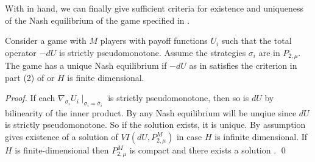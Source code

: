 With  in hand, we can finally give sufficient criteria for existence and uniqueness of the Nash equilibrium of the game specified in .
\begin{theorem} \label{thm:nash_unique}
  Consider a game with $M$ players with payoff functions $U_i$ such that the total operator $-dU$ is strictly pseudomonotone. Assume the strategies $\sigma_i$ are in $P_{2,\mu}$. The game has a unique Nash equilibrium if $-dU$ as in  satisfies the criterion in part (2) of  or $H$ is finite dimensional.
\end{theorem}
\begin{proof}
   If each $\nabla_{\sigma_i} U_i \mid_{\sigma_i = \overbar{\sigma}_i}$ is strictly pseudomonotone, then so is $dU$ by bilinearity of the inner product. By  any Nash equilibrium will be unqiue since $dU$ is strictly pseudomonotone. So if the solution exists, it is unique. By assumption  gives existence of a solution of $VI(dU,P_{2,\mu}^M)$ in case $H$ is infinite dimensional. If $H$ is finite-dimensional then $P_{2,\mu}^M$ is compact and there exists a solution . \qed
\end{proof}

